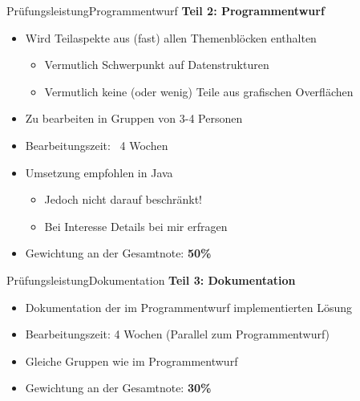 \begin{frame}{Prüfungsleistung}{Programmentwurf}
	\textbf{Teil 2: Programmentwurf}
	\begin{itemize}
		\item Wird Teilaspekte aus (fast) allen Themenblöcken enthalten
		\begin{itemize}
			\item Vermutlich Schwerpunkt auf Datenstrukturen
			\item Vermutlich keine (oder wenig) Teile aus grafischen Overflächen
		\end{itemize}
		\item Zu bearbeiten in Gruppen von 3-4 Personen
		\item Bearbeitungszeit: ~4 Wochen
		\item Umsetzung empfohlen in Java
		\begin{itemize}
			\item Jedoch nicht darauf beschränkt!
			\item Bei Interesse Details bei mir erfragen
		\end{itemize}
		\item Gewichtung an der Gesamtnote: \textbf{50\%}
	\end{itemize}
\end{frame}

\begin{frame}{Prüfungsleistung}{Dokumentation}
	\textbf{Teil 3: Dokumentation}
	\begin{itemize}
		\item Dokumentation der im Programmentwurf implementierten Lösung
		\item Bearbeitungszeit: 4 Wochen (Parallel zum Programmentwurf)
		\item Gleiche Gruppen wie im Programmentwurf
		\item Gewichtung an der Gesamtnote: \textbf{30\%}
	\end{itemize}
\end{frame}